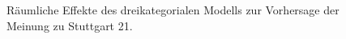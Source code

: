 \documentclass{Vorlage}
\begin{document}
\begin{figure}[htbp]
  \caption{Räumliche Effekte des dreikategorialen Modells zur Vorhersage der Meinung zu Stuttgart 21.}
  \label{rEffS21}
\end{figure}
\end{document}
